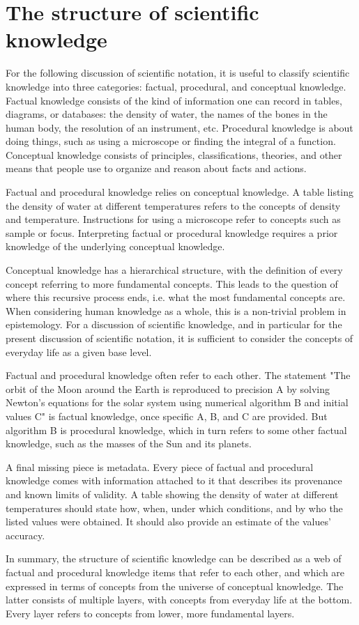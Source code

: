 \section{The structure of scientific knowledge}
\label{scientific-knowledge}

For the following discussion of scientific notation, it is useful to classify scientific knowledge into three categories: factual, procedural, and conceptual knowledge. Factual knowledge consists of the kind of information one can record in tables, diagrams, or databases: the density of water, the names of the bones in the human body, the resolution of an instrument, etc. Procedural knowledge is about doing things, such as using a microscope or finding the integral of a function. Conceptual knowledge consists of principles, classifications, theories, and other means that people use to organize and reason about facts and actions.

Factual and procedural knowledge relies on conceptual knowledge. A table listing the density of water at different temperatures refers to the concepts of density and temperature. Instructions for using a microscope refer to concepts such as sample or focus. Interpreting factual or procedural knowledge requires a prior knowledge of the underlying conceptual knowledge.

Conceptual knowledge has a hierarchical structure, with the definition of every concept referring to more fundamental concepts. This leads to the question of where this recursive process ends, i.e. what the most fundamental concepts are. When considering human knowledge as a whole, this is a non-trivial problem in epistemology. For a discussion of scientific knowledge, and in particular for the present discussion of scientific notation, it is sufficient to consider the concepts of everyday life as a given base level.

Factual and procedural knowledge often refer to each other. The statement "The orbit of the Moon around the Earth is reproduced to precision A by solving Newton's equations for the solar system using numerical algorithm B and initial values C" is factual knowledge, once specific A, B, and C are provided. But algorithm B is procedural knowledge, which in turn refers to some other factual knowledge, such as the masses of the Sun and its planets.

A final missing piece is metadata. Every piece of factual and procedural knowledge comes with information attached to it that describes its provenance and known limits of validity. A table showing the density of water at different temperatures should state how, when, under which conditions, and by who the listed values were obtained. It should also provide an estimate of the values' accuracy.

In summary, the structure of scientific knowledge can be described as a web of factual and procedural knowledge items that refer to each other, and which are expressed in terms of concepts from the universe of conceptual knowledge. The latter consists of multiple layers, with concepts from everyday life at the bottom. Every layer refers to concepts from lower, more fundamental layers.